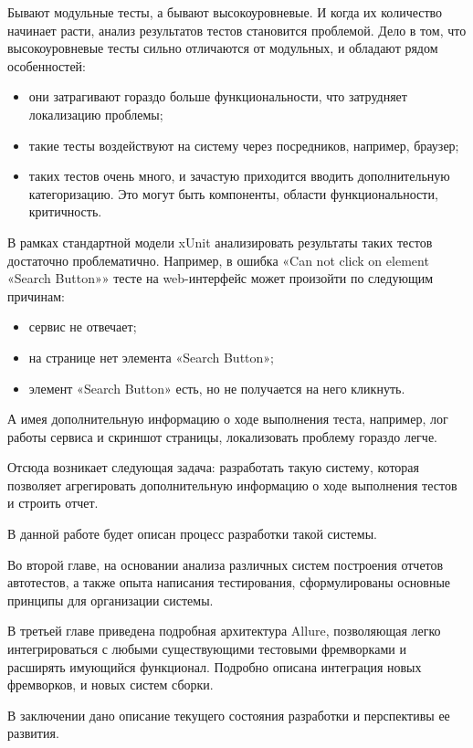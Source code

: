 \startprefacepage



Бывают модульные тесты, а бывают высокоуровневые. И когда их количество начинает расти, анализ результатов тестов становится проблемой. Дело в том, что высокоуровневые тесты сильно отличаются от модульных, и обладают рядом особенностей:

\begin{itemize}
\item они затрагивают гораздо больше функциональности, что затрудняет локализацию проблемы; 
\item такие тесты воздействуют на систему через посредников, например, браузер;
\item таких тестов очень много, и зачастую приходится вводить дополнительную категоризацию. Это могут быть компоненты, области функциональности, критичность.
\end{itemize}

В рамках стандартной модели xUnit анализировать результаты таких тестов достаточно проблематично. Например, в ошибка «Can not click on element «Search Button»» тесте на web-интерфейс может произойти по следующим причинам:

\begin{itemize}
\item сервис не отвечает;
\item на странице нет элемента «Search Button»;
\item элемент «Search Button» есть, но не получается на него кликнуть.
\end{itemize}

А имея дополнительную информацию о ходе выполнения теста, например, лог работы сервиса и скриншот страницы, локализовать проблему гораздо легче. 

Отсюда возникает следующая задача: разработать такую систему, которая позволяет агрегировать дополнительную информацию о ходе выполнения тестов и строить отчет. 

В данной работе будет описан процесс разработки такой системы.

Во второй главе, на основании анализа различных систем построения отчетов автотестов, а также опыта написания тестирования, сформулированы основные принципы для организации системы.

В третьей главе приведена подробная архитектура Allure, позволяющая легко интегрироваться с любыми существующими тестовыми фремворками и расширять имующийся функционал. Подробно описана интеграция новых фремворков, и новых систем сборки.

В заключении дано описание текущего состояния разработки и перспективы ее развития.
